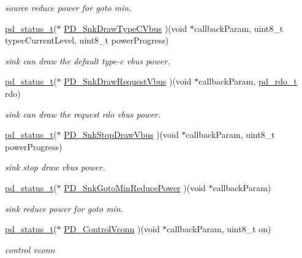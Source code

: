 \begin{DoxyCompactItemize}
\begin{DoxyCompactList}\small\item\em source reduce power for goto min. \end{DoxyCompactList}\item 
\hyperlink{group__usb__pd__stack_ga04a1f331d9807a70ab9bb753f5ed1c80}{pd\-\_\-status\-\_\-t}($\ast$ \hyperlink{struct__pd__power__callback_a2a64b10db4e1644e17ee04e0a19cc412}{P\-D\-\_\-\-Snk\-Draw\-Type\-C\-Vbus} )(void $\ast$callback\-Param, uint8\-\_\-t typec\-Current\-Level, uint8\-\_\-t power\-Progress)
\begin{DoxyCompactList}\small\item\em sink can draw the default type-\/c vbus power. \end{DoxyCompactList}\item 
\hyperlink{group__usb__pd__stack_ga04a1f331d9807a70ab9bb753f5ed1c80}{pd\-\_\-status\-\_\-t}($\ast$ \hyperlink{struct__pd__power__callback_ac1b908d8a0b3cad5c449cde3e7b169b4}{P\-D\-\_\-\-Snk\-Draw\-Request\-Vbus} )(void $\ast$callback\-Param, \hyperlink{group__usb__pd__stack_ga4dcb1103574222cf94d4b45128f2b884}{pd\-\_\-rdo\-\_\-t} rdo)
\begin{DoxyCompactList}\small\item\em sink can draw the request rdo vbus power. \end{DoxyCompactList}\item 
\hyperlink{group__usb__pd__stack_ga04a1f331d9807a70ab9bb753f5ed1c80}{pd\-\_\-status\-\_\-t}($\ast$ \hyperlink{struct__pd__power__callback_a18806d06567f385463bba77f8202da49}{P\-D\-\_\-\-Snk\-Stop\-Draw\-Vbus} )(void $\ast$callback\-Param, uint8\-\_\-t power\-Progress)
\begin{DoxyCompactList}\small\item\em sink stop draw vbus power. \end{DoxyCompactList}\item 
\hyperlink{group__usb__pd__stack_ga04a1f331d9807a70ab9bb753f5ed1c80}{pd\-\_\-status\-\_\-t}($\ast$ \hyperlink{struct__pd__power__callback_a6db9643def50ef309e1d66abd6943e1d}{P\-D\-\_\-\-Snk\-Goto\-Min\-Reduce\-Power} )(void $\ast$callback\-Param)
\begin{DoxyCompactList}\small\item\em sink reduce power for goto min. \end{DoxyCompactList}\item 
\hyperlink{group__usb__pd__stack_ga04a1f331d9807a70ab9bb753f5ed1c80}{pd\-\_\-status\-\_\-t}($\ast$ \hyperlink{struct__pd__power__callback_a406d88fa8818ca8257f005c5097859e9}{P\-D\-\_\-\-Control\-Vconn} )(void $\ast$callback\-Param, uint8\-\_\-t on)
\begin{DoxyCompactList}\small\item\em control vconn \end{DoxyCompactList}\end{DoxyCompactItemize}


